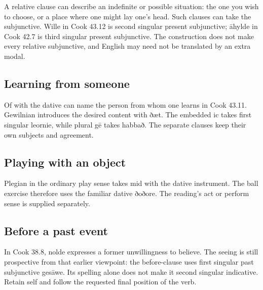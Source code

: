 A relative clause can describe an indefinite or possible situation: the one you wish to choose, or a place where one might lay one’s head. Such clauses can take the subjunctive. Wille in Cook 43.12 is second singular present subjunctive; āhylde in Cook 42.7 is third singular present subjunctive. The construction does not make every relative subjunctive, and English may need not be translated by an extra modal.

\subsection*{Learning from someone}

Of with the dative can name the person from whom one learns in Cook 43.11. Gewilnian introduces the desired content with ðæt. The embedded ic takes first singular leornie, while plural gē takes habbað. The separate clauses keep their own subjects and agreement.

\subsection*{Playing with an object}

Plegian in the ordinary play sense takes mid with the dative instrument. The ball exercise therefore uses the familiar dative ðoðore. The reading’s act or perform sense is supplied separately.

\subsection*{Before a past event}

In Cook 38.8, nolde expresses a former unwillingness to believe. The seeing is still prospective from that earlier viewpoint: the before-clause uses first singular past subjunctive gesāwe. Its spelling alone does not make it second singular indicative. Retain self and follow the requested final position of the verb.

